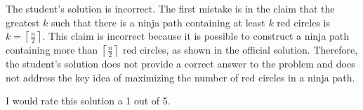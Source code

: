 The student's solution is incorrect. The first mistake is in the claim that the greatest $k$ such that there is a ninja path containing at least $k$ red circles is $k = \left\lceil \frac{n}{2} \right\rceil$. This claim is incorrect because it is possible to construct a ninja path containing more than $\left\lceil \frac{n}{2} \right\rceil$ red circles, as shown in the official solution. Therefore, the student's solution does not provide a correct answer to the problem and does not address the key idea of maximizing the number of red circles in a ninja path. 

I would rate this solution a 1 out of 5.
